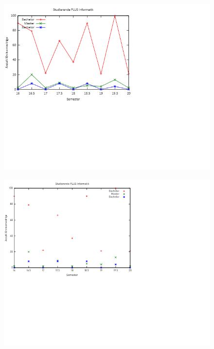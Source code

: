 \documentclass[12pt,fleqn]{article}
\begin{document}
	\begin{figure}[H]
		\includegraphics[scale = 1.125]{3.png}

	\end{figure}
	\begin{figure}[H]
		\includegraphics[scale = 1.125]{4.png}

	\end{figure}
\end{document}
